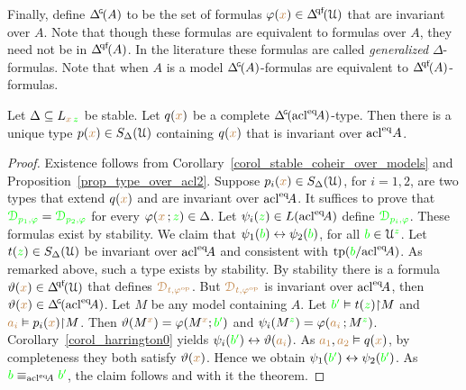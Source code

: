 Finally, define \emph{$\GDelta(A)$\/} to be the set of formulas $\phi({\mr x})\in\qfDelta(\U)$ that are invariant over $A$.
Note that though these formulas are equivalent to formulas over $A$, they need not be in $\qfDelta(A)$.
In the literature these formulas are called \textit{generalized\/} $\Delta$-formulas.
Note that when $A$ is a model $\GDelta(A)$-formulas are equivalent to $\qfDelta(A)$-formulas.

\begin{theorem}[ (Stationarity)]\label{thm_stationarity}
  Let $\Delta\subseteq L_{{\color{brown} x}\,{\color{green} z}}$ be stable.
  Let $q({\color{brown} x})$ be a complete $\GDelta(\acl^\eq\!A)$-type.
  Then there is a unique type $p({\color{brown} x})\in S_\Delta(\EuScript U)$ containing $q({\color{brown} x})$ that is invariant over ${\rm acl}^{{\rm eq}} A$.
\end{theorem}

\begin{proof}
  Existence follows from Corollary~\ref{corol_stable_coheir_over_models} and Proposition~\ref{prop_type_over_acl2}.
  Suppose $p_i({\color{brown} x})\in S_\Delta(\EuScript U)$, for $i=1,2$, are two types that extend $q({\color{brown} x})$ and are invariant over ${\rm acl}^{{\rm eq}}\!A$.
  It suffices to prove that ${\color{green}\EuScript D_{p_1,\varphi}}={\color{green}\EuScript D_{p_2,\varphi}}$ for every $\varphi({\color{brown} x}\,;{\color{green} z})\in\Delta$.
  Let $\psi_i({\color{green} z})\in L({\rm acl}^{{\rm eq}}\!A)$ define ${\color{green}\EuScript D_{p_i,\varphi}}$.
  These formulas exist by stability.
  We claim that $\psi_1({\color{green} b})\leftrightarrow\psi_2({\color{green} b})$, for all ${\color{green} b}\in\EuScript U^{\color{green} z}$.
  Let $t({\color{green} z})\in S_\Delta(\EuScript U)$ be invariant over ${\rm acl}^{{\rm eq}}\!A$ and consistent with ${\rm tp}({\color{green} b}/{\rm acl}^{{\rm eq}}\!A)$.
  As remarked above, such a type exists by stability.
  By stability there is a formula $\theta({\mr x})\in\qfDelta(\U)$ that defines ${\color{brown}\EuScript D_{t,\varphi^{\rm op}}}$.
  But ${\color{brown}\EuScript D_{t,\varphi^{\rm op}}}$ is invariant over ${\rm acl}^{{\rm eq}}\!A$, then $\theta({\mr x})\in\GDelta(\acl^\eq\!A)$.
  Let $M$ be any model containing $A$.
  Let ${\color{green} b'}\vDash t({\color{green} z}){\restriction}M$ and ${\color{brown} a_i}\vDash p_i({\color{brown} x}){\restriction}M$.
  Then $\vartheta(M^{\color{brown} x})=\varphi(M^{\color{brown} x};{\color{green} b'})$ and $\psi_i(M^{\color{green} z})=\varphi({\color{brown} a_i}\,;M^{\color{green} z})$.
  Corollary~\ref{corol_harrington0} yields $\psi_i({\color{green} b'})\leftrightarrow\vartheta({\color{brown} a_i})$.
  As ${\color{brown} a_1},{\color{brown} a_2}\vDash q({\color{brown} x})$, by completeness they both satisfy $\vartheta({\color{brown} x})$. 
  Hence we obtain $\psi_1({\color{green} b'})\leftrightarrow\psi_2({\color{green} b'})$.
  As ${\color{green} b}\equiv_{{\rm acl}^{{\rm eq}}\!A}{\color{green} b'}$, the claim follows and with it the theorem.
\end{proof}


